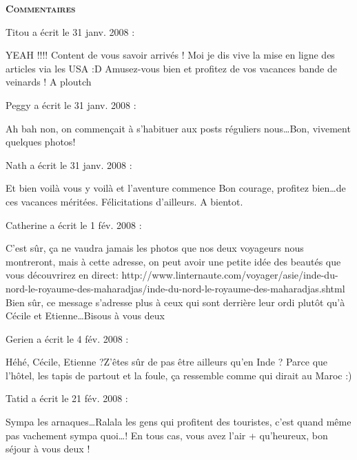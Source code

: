 \bigskip
\textbf{\textsc{Commentaires}}

\medskip
Titou a écrit le 31 janv. 2008 :
\begin{displayquote}
YEAH !!!!
Content de vous savoir arrivés ! Moi je dis vive la mise en ligne des articles via les USA :D Amusez-vous bien et profitez de vos vacances bande de veinards ! A ploutch
\end{displayquote}

\medskip
Peggy a écrit le 31 janv. 2008 :
\begin{displayquote}
Ah bah non, on commençait à s'habituer aux posts réguliers nous\dots Bon, vivement quelques photos!
\end{displayquote}

\medskip
Nath a écrit le 31 janv. 2008 :
\begin{displayquote}
Et bien voilà vous y voilà  et l'aventure commence
Bon courage, profitez bien\dots de ces vacances méritées. Félicitations d'ailleurs.
A bientot.
\end{displayquote}

\medskip
Catherine a écrit le 1 fév. 2008 :
\begin{displayquote}
C'est sûr, ça ne vaudra jamais les photos que nos deux voyageurs nous montreront, mais à cette adresse, on peut avoir une petite idée des beautés que vous découvrirez en direct: http://www.linternaute.com/voyager/asie/inde-du-nord-le-royaume-des-maharadjas/inde-du-nord-le-royaume-des-maharadjas.shtml
Bien sûr, ce message s'adresse plus à ceux qui sont derrière leur ordi plutôt qu'à Cécile et Etienne\dots Bisous à vous deux
\end{displayquote}

\medskip
Gerien a écrit le 4 fév. 2008 :
\begin{displayquote}
Héhé,
Cécile, Etienne ?Z'êtes sûr de pas être ailleurs qu'en Inde ?
Parce que l'hôtel, les tapis de partout et la foule, ça ressemble comme qui dirait au Maroc :)
\end{displayquote}

\medskip
Tatid a écrit le 21 fév. 2008 :
\begin{displayquote}
Sympa les arnaques\dots Ralala les gens qui profitent des touristes, c'est quand même pas vachement sympa quoi\dots !
En tous cas, vous avez l'air + qu'heureux, bon séjour à vous deux !
\end{displayquote}

\vfill
